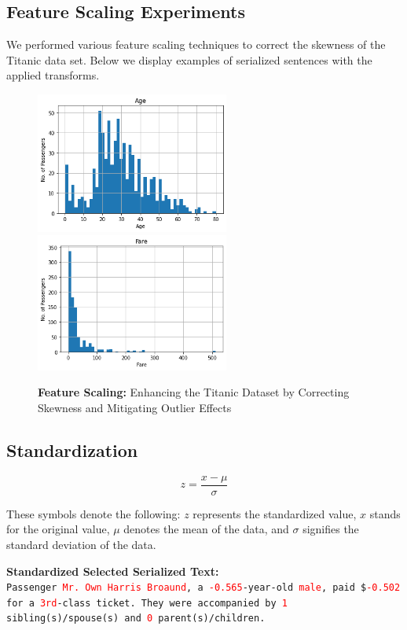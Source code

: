 \documentclass{article}
\theoremstyle{plain}
\theoremstyle{definition}
\theoremstyle{remark}
\begin{document}
\subsection{Feature Scaling Experiments}

We performed various feature scaling techniques to correct the skewness of the Titanic data set. Below we display examples of serialized sentences with the applied transforms.

\begin{figure}[H]
    \centering
    \includegraphics[width=2.5in]{skew.png}
    \includegraphics[width=2.5in]{skew1.png}
    \caption{\textbf{Feature Scaling:} Enhancing the Titanic Dataset by Correcting Skewness and Mitigating Outlier Effects}
    \label{fig:enter-label}
\end{figure}


\subsection*{Standardization}

\begin{equation}
z = \frac{x - \mu}{\sigma}
\end{equation}

These symbols denote the following: \( z \) represents the standardized value, \( x \) stands for the original value, \( \mu \) denotes the mean of the data, and \( \sigma \) signifies the standard deviation of the data.

\begin{mdframed}
\textbf{Standardized Selected Serialized Text:}\\
\texttt{Passenger \textcolor{red}{Mr. Own Harris Broaund}, a \textcolor{red}{-0.565}-year-old \textcolor{red}{male}, paid \$\textcolor{red}{-0.502} for a \textcolor{red}{3rd}-class ticket. They were accompanied by \textcolor{red}{1} sibling(s)/spouse(s) and \textcolor{red}{0} parent(s)/children.
}
\end{mdframed}
\end{document}
